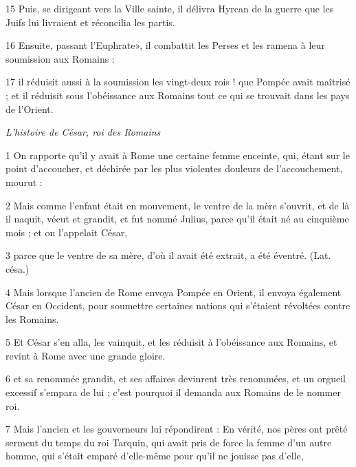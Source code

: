 \par 15 Puis, se dirigeant vers la Ville sainte, il délivra Hyrcan de la guerre que les Juifs lui livraient et réconcilia les partis.

\par 16 Ensuite, passant l'Euphrate», il combattit les Perses et les ramena à leur soumission aux Romains :

\par 17 il réduisit aussi à la soumission les vingt-deux rois ! que Pompée avait maîtrisé ; et il réduisit sous l'obéissance aux Romains tout ce qui se trouvait dans les pays de l'Orient.


\par \textit{L'histoire de César, roi des Romains}

\par 1 On rapporte qu'il y avait à Rome une certaine femme enceinte, qui, étant sur le point d'accoucher, et déchirée par les plus violentes douleurs de l'accouchement, mourut :

\par 2 Mais comme l'enfant était en mouvement, le ventre de la mère s'ouvrit, et de là il naquit, vécut et grandit, et fut nommé Julius, parce qu'il était né au cinquième mois ; et on l'appelait César,

\par 3 parce que le ventre de sa mère, d'où il avait été extrait, a été éventré. (Lat. césa.)

\par 4 Mais lorsque l'ancien de Rome envoya Pompée en Orient, il envoya également César en Occident, pour soumettre certaines nations qui s'étaient révoltées contre les Romains.

\par 5 Et César s'en alla, les vainquit, et les réduisit à l'obéissance aux Romains, et revint à Rome avec une grande gloire.

\par 6 et sa renommée grandit, et ses affaires devinrent très renommées, et un orgueil excessif s'empara de lui ; c'est pourquoi il demanda aux Romains de le nommer roi.

\par 7 Mais l'ancien et les gouverneurs lui répondirent : En vérité, nos pères ont prêté serment du temps du roi Tarquin, qui avait pris de force la femme d'un autre homme, qui s'était emparé d'elle-même pour qu'il ne jouisse pas d'elle,

